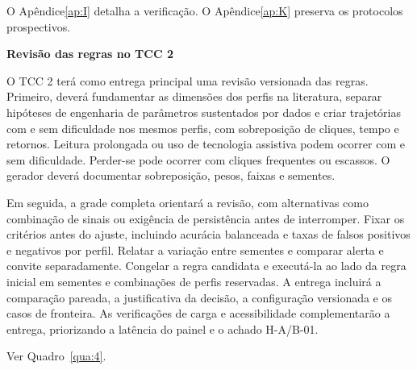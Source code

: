O Apêndice\nobreakspace{}\ref{ap:I} detalha a verificação. O Apêndice\nobreakspace{}\ref{ap:K} preserva os protocolos prospectivos.

\textbf{Revisão das regras no TCC 2}

O TCC 2 terá como entrega principal uma revisão versionada das regras. Primeiro, deverá fundamentar as dimensões dos perfis na literatura, separar hipóteses de engenharia de parâmetros sustentados por dados e criar trajetórias com e sem dificuldade nos mesmos perfis, com sobreposição de cliques, tempo e retornos. Leitura prolongada ou uso de tecnologia assistiva podem ocorrer com e sem dificuldade. Perder-se pode ocorrer com cliques frequentes ou escassos. O gerador deverá documentar sobreposição, pesos, faixas e sementes.

Em seguida, a grade completa orientará a revisão, com alternativas como combinação de sinais ou exigência de persistência antes de interromper. Fixar os critérios antes do ajuste, incluindo acurácia balanceada e taxas de falsos positivos e negativos por perfil. Relatar a variação entre sementes e comparar alerta e convite separadamente. Congelar a regra candidata e executá-la ao lado da regra inicial em sementes e combinações de perfis reservadas. A entrega incluirá a comparação pareada, a justificativa da decisão, a configuração versionada e os casos de fronteira. As verificações de carga e acessibilidade complementarão a entrega, priorizando a latência do painel e o achado H-A/B-01.

\noindent Ver Quadro~\ref{qua:4}.

